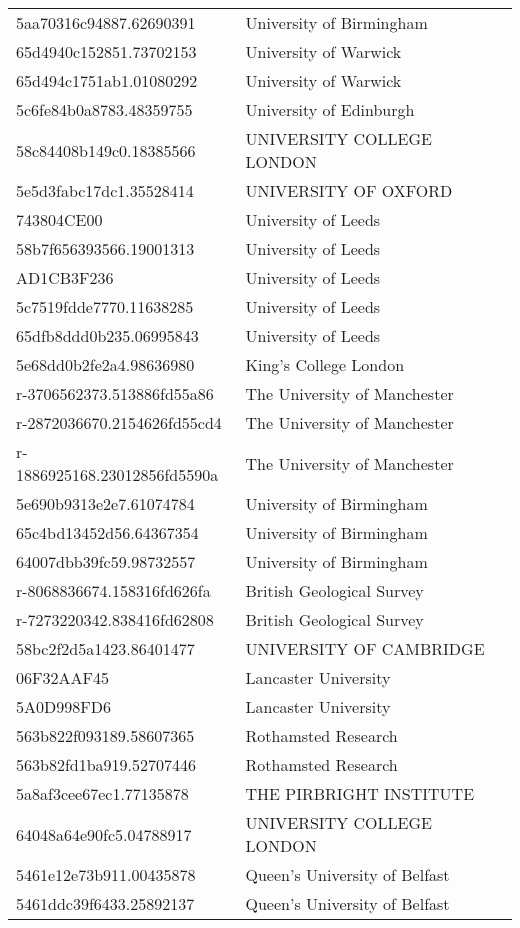 \begin{tabular}{ll}
5aa70316c94887.62690391 & University of Birmingham \\
65d4940c152851.73702153 & University of Warwick \\
65d494c1751ab1.01080292 & University of Warwick \\
5c6fe84b0a8783.48359755 & University of Edinburgh \\
58c84408b149c0.18385566 & UNIVERSITY COLLEGE LONDON \\
5e5d3fabc17dc1.35528414 & UNIVERSITY OF OXFORD \\
743804CE00 & University of Leeds \\
58b7f656393566.19001313 & University of Leeds \\
AD1CB3F236 & University of Leeds \\
5c7519fdde7770.11638285 & University of Leeds \\
65dfb8ddd0b235.06995843 & University of Leeds \\
5e68dd0b2fe2a4.98636980 & King's College London \\
r-3706562373.513886fd55a86 & The University of Manchester \\
r-2872036670.2154626fd55cd4 & The University of Manchester \\
r-1886925168.23012856fd5590a & The University of Manchester \\
5e690b9313e2e7.61074784 & University of Birmingham \\
65c4bd13452d56.64367354 & University of Birmingham \\
64007dbb39fc59.98732557 & University of Birmingham \\
r-8068836674.158316fd626fa & British Geological Survey \\
r-7273220342.838416fd62808 & British Geological Survey \\
58bc2f2d5a1423.86401477 & UNIVERSITY OF CAMBRIDGE \\
06F32AAF45 & Lancaster University \\
5A0D998FD6 & Lancaster University \\
563b822f093189.58607365 & Rothamsted Research \\
563b82fd1ba919.52707446 & Rothamsted Research \\
5a8af3cee67ec1.77135878 & THE PIRBRIGHT INSTITUTE \\
64048a64e90fc5.04788917 & UNIVERSITY COLLEGE LONDON \\
5461e12e73b911.00435878 & Queen's University of Belfast \\
5461ddc39f6433.25892137 & Queen's University of Belfast \\

\end{tabular}
